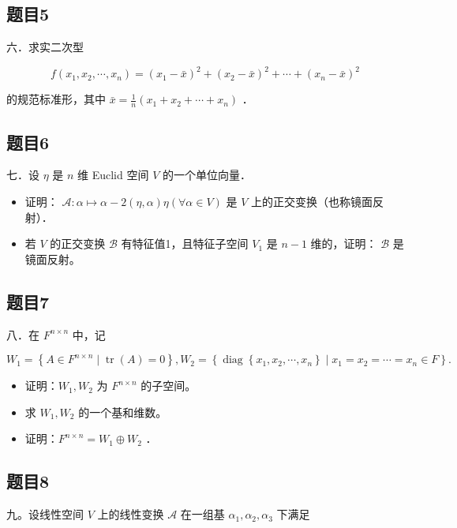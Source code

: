 \documentclass{article}
\begin{document}
\subsection{题目5}
六．求实二次型

\[
f\left(x_{1}, x_{2}, \cdots, x_{n}\right)=\left(x_{1}-\bar{x}\right)^{2}+\left(x_{2}-\bar{x}\right)^{2}+\cdots+\left(x_{n}-\bar{x}\right)^{2}
\]

的规范标准形，其中 \(\bar{x}=\frac{1}{n}\left(x_{1}+x_{2}+\cdots+x_{n}\right)\) ．

\subsection{题目6}
七．设 \(\eta\) 是 \(n\) 维 Euclid 空间 \(V\) 的一个单位向量．

\begin{itemize}
  \item[（1）] 证明： \(\mathcal{A}: \alpha \mapsto \alpha-2(\eta, \alpha) \eta(\forall \alpha \in V)\) 是 \(V\) 上的正交变换（也称镜面反射）．
  \item[（2）] 若 \(V\) 的正交变换 \(\mathcal{B}\) 有特征值1，且特征子空间 \(V_{1}\) 是 \(n-1\) 维的，证明： \(\mathcal{B}\) 是镜面反射。
\end{itemize}

\subsection{题目7}
八．在 \(F^{n \times n}\) 中，记

\[
W_{1}=\left\{A \in F^{n \times n} \mid \operatorname{tr}(A)=0\right\}, W_{2}=\left\{\operatorname{diag}\left\{x_{1}, x_{2}, \cdots, x_{n}\right\} \mid x_{1}=x_{2}=\cdots=x_{n} \in F\right\} .
\]

\begin{itemize}
  \item[（1）] 证明：\(W_{1}, W_{2}\) 为 \(F^{n \times n}\) 的子空间。
  \item[（2）] 求 \(W_{1}, W_{2}\) 的一个基和维数。
  \item[（3）] 证明：\(F^{n \times n}=W_{1} \oplus W_{2}\) ．
\end{itemize}

\subsection{题目8}
九。设线性空间 \(V\) 上的线性变换 \(\mathcal{A}\) 在一组基 \(\alpha_{1}, \alpha_{2}, \alpha_{3}\) 下满足
\end{document}
